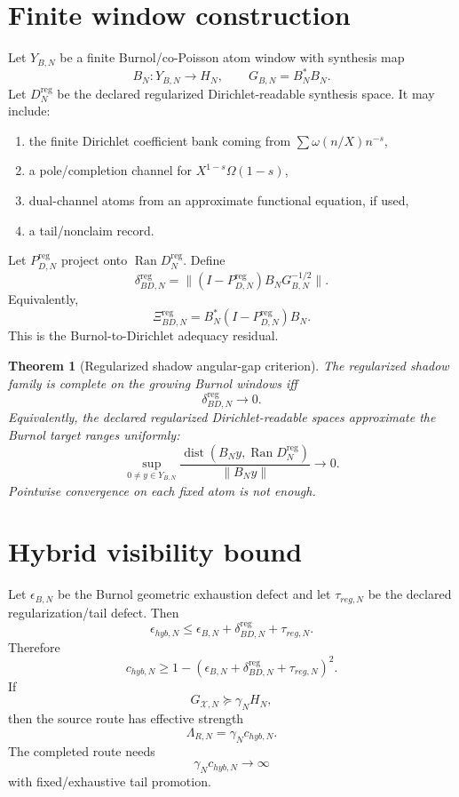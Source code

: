 \documentclass[11pt]{article}
\newtheorem{theorem}{Theorem}
\begin{document}
\section{Finite window construction}
Let \(Y_{B,N}\) be a finite Burnol/co-Poisson atom window with synthesis map
\[
B_N:Y_{B,N}\to H_N,
\qquad
G_{B,N}=B_N^*B_N.
\]
Let \(D_N^{\mathrm{reg}}\) be the declared regularized Dirichlet-readable synthesis space. It may include:
\begin{enumerate}[label=(\roman*)]
\item the finite Dirichlet coefficient bank coming from \(\sum\omega(n/X)n^{-s}\),
\item a pole/completion channel for \(X^{1-s}\Omega(1-s)\),
\item dual-channel atoms from an approximate functional equation, if used,
\item a tail/nonclaim record.
\end{enumerate}
Let \(P_{D,N}^{\mathrm{reg}}\) project onto \(\operatorname{Ran}D_N^{\mathrm{reg}}\). Define
\[
\delta_{BD,N}^{\mathrm{reg}}
=
\|(I-P_{D,N}^{\mathrm{reg}})B_NG_{B,N}^{-1/2}\|.
\]
Equivalently,
\[
\Xi_{BD,N}^{\mathrm{reg}}
=
B_N^*(I-P_{D,N}^{\mathrm{reg}})B_N.
\]
This is the Burnol-to-Dirichlet adequacy residual.

\begin{theorem}[Regularized shadow angular-gap criterion]
The regularized shadow family is complete on the growing Burnol windows iff
\[
\delta_{BD,N}^{\mathrm{reg}}\to0.
\]
Equivalently, the declared regularized Dirichlet-readable spaces approximate the Burnol target ranges uniformly:
\[
\sup_{0\ne y\in Y_{B,N}}
\frac{\operatorname{dist}(B_Ny,\operatorname{Ran}D_N^{\mathrm{reg}})}{\|B_Ny\|}
\to0.
\]
Pointwise convergence on each fixed atom is not enough.
\end{theorem}

\section{Hybrid visibility bound}
Let \(\epsilon_{B,N}\) be the Burnol geometric exhaustion defect and let \(\tau_{reg,N}\) be the declared regularization/tail defect. Then
\[
\epsilon_{hyb,N}
\le
\epsilon_{B,N}+\delta_{BD,N}^{\mathrm{reg}}+\tau_{reg,N}.
\]
Therefore
\[
c_{hyb,N}
\ge
1-(\epsilon_{B,N}+\delta_{BD,N}^{\mathrm{reg}}+\tau_{reg,N})^2.
\]
If
\[
G_{\mathcal X,N}\succeq \gamma_N H_N,
\]
then the source route has effective strength
\[
\Lambda_{R,N}=\gamma_Nc_{hyb,N}.
\]
The completed route needs
\[
\gamma_Nc_{hyb,N}\to\infty
\]
with fixed/exhaustive tail promotion.
\end{document}
